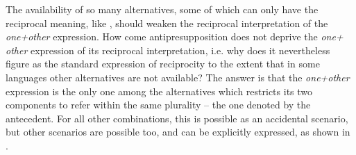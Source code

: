 \documentclass[output=paper,colorlinks,citecolor=brown]{langscibook}
\begin{document}
\noindent The availability of so many alternatives, some of which can only have the reciprocal meaning, like , should weaken the reciprocal interpretation of the \textit{one+other} expression. How come antipresupposition does not deprive the \textit{one+ other} expression of its reciprocal interpretation, i.e. why does it nevertheless fi\-gure as the standard expression of reciprocity to the extent that in some languages other alternatives are not available? The answer is that the \textit{one+other} expression is the only one among the alternatives which restricts its two components to refer within the same plurality -- the one denoted by the antecedent. For all other combinations, this is possible as an accidental scenario, but other scenarios are possible too, and can be explicitly expressed, as shown in .
\end{document}
